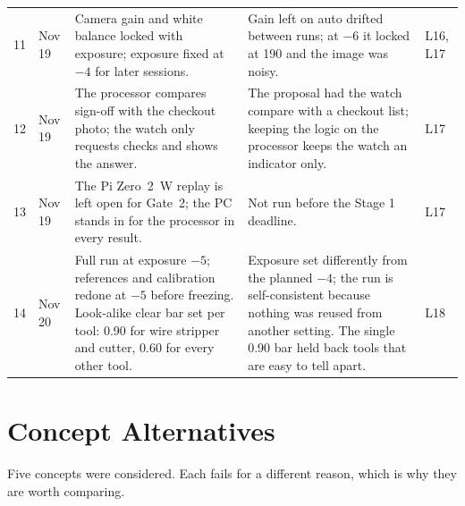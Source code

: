 \begin{table}[!t]
\begin{tabularx}{\textwidth}{@{}l l Y Y l@{}}
11 & Nov 19 & Camera gain and white balance locked with exposure; exposure fixed at $-4$ for later sessions. & Gain left on auto drifted between runs; at $-6$ it locked at 190 and the image was noisy. & L16, L17 \\
12 & Nov 19 & The processor compares sign-off with the checkout photo; the watch only requests checks and shows the answer. & The proposal had the watch compare with a checkout list; keeping the logic on the processor keeps the watch an indicator only. & L17 \\
13 & Nov 19 & The Pi Zero~2~W replay is left open for Gate~2; the PC stands in for the processor in every result. & Not run before the Stage 1 deadline. & L17 \\
14 & Nov 20 & Full run at exposure $-5$; references and calibration redone at $-5$ before freezing. Look-alike clear bar set per tool: 0.90 for wire stripper and cutter, 0.60 for every other tool. & Exposure set differently from the planned $-4$; the run is self-consistent because nothing was reused from another setting. The single 0.90 bar held back tools that are easy to tell apart. & L18 \\
\bottomrule
\end{tabularx}
\end{table}

\section{Concept Alternatives}
Five concepts were considered. Each fails for a different reason, which is
why they are worth comparing.

